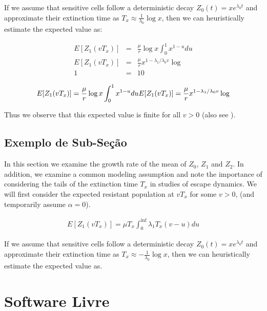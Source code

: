 \documentclass{classe_cn}                 %
\begin{document}
If we assume that sensitive cells follow a deterministic decay $Z_0(t) = xe^{\lambda_0 t}$ and approximate their extinction time as $T_x \approx \frac{1}{\lambda_0} \log x$, then we can heuristically estimate the expected value as:

\begin{eqnarray}
\label{eqexpmuts}
  E [Z_1(vT_x)] &=& \frac{\mu}{r}\log x \int_0^{1} x^{1-u} du \\
  E [Z_1(vT_x)] &=& \frac{\mu}{r}x^{1-{\lambda_1}/{\lambda_0}v}\log  \\
  1 &=& 10
\end{eqnarray}

\begin{equation}
  E [Z_1(vT_x)] = \frac{\mu}{r}\log x \int_0^{1} x^{1-u} du \\
  E [Z_1(vT_x)] = \frac{\mu}{r}x^{1-{\lambda_1}/{\lambda_0}v}\log 
\end{equation}

Thus we observe that this expected value is finite for all $v>0$ (also see \cite{Rosenfeld:1970}).

\subsection{Exemplo de Sub-Seção}

In this section we examine the growth rate of the mean of $Z_0$, $Z_1$ and $Z_2$. In addition, we examine a common modeling assumption and note the importance of considering the tails of the extinction time $T_x$ in studies of escape dynamics. We will first consider the expected resistant population at $vT_x$ for some $v>0$, (and temporarily assume $\alpha=0$).

\begin{eqnarray}
E [Z_1(vT_x)]= \mu T_x \int_{0}^{\inf} \lambda_1T_x(v-u)du
\end{eqnarray}

If we assume that sensitive cells follow a deterministic decay $Z_0(t)=xe^{\lambda_0 t}$ and approximate their extinction time as $T_x\approx-\frac{1}{\lambda_0}\log x$, then we can heuristically estimate the expected value as.

\section{Software Livre}
\end{document}
